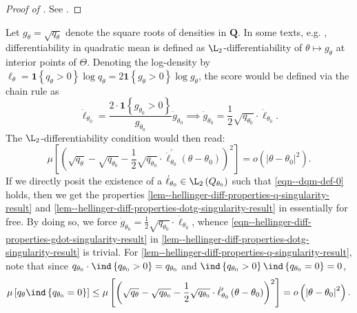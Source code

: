 \begin{proof}[Proof of ]
See .
\end{proof}

Let \(g_{\theta} = \sqrt{q_{\theta}}\) denote the square roots of densities in
\(\mathbf{Q}\).
In some texts, e.g. \citet{1998bickelEfficientAdaptiveEstimation},
differentiability in quadratic mean is defined as \(\L_{2}\)-differentiability
of \(\theta \mapsto g_{\theta}\) at interior points of \(\Theta\).
Denoting the log-density by \(\ell_{\theta} = \mathbf{1} \left\{
q_{\theta} > 0 \right\} \log q_{\theta} = 2 \mathbf{1} \left\{ g_{\theta} > 0
\right\} \log g_{\theta}\), the score would be defined via the chain rule as
\begin{equation}
  \dot{\ell}_{\theta_{0}} = \frac{2 \cdot \mathbf{1} \left\{ g_{\theta_{0}} > 0
  \right\}}{g_{\theta_{0}}} \dot{g}_{\theta_{0}} \implies \dot{g}_{\theta_{0}}
  = \frac{1}{2} \sqrt{q_{\theta_{0}}} \cdot \dot{\ell}_{\theta_{0}}.
  \label{eqn--score-root-density-deriv}
\end{equation}
The \(\L_{2}\)-differentiability condition would then read:
\begin{equation}
  \mu \left[ \left( \sqrt{q_{\theta}} - \sqrt{q_{\theta_{0}}} - \frac{1}{2}
  \sqrt{q_{\theta_{0}}} \cdot \dot{\ell}_{\theta_{0}}^{\prime} \left( \theta -
  \theta_{0} \right) \right)^{2} \right] = o \left( \left| \theta -
  \theta_{0} \right|^{2} \right).
  \label{eqn--dqm-def-0}
\end{equation}
If we directly posit the existence of a \(\dot{\ell}_{\theta_{0}} \in \L_{2}
\left( Q_{\theta_{0}} \right)\) such that \eqref{eqn--dqm-def-0} holds,
then we get the properties
\ref{lem--hellinger-diff-properties-q-singularity-result} and
\ref{lem--hellinger-diff-properties-dotg-singularity-result} in
 essentially for free.
By doing so, we force
\(\dot{g}_{\theta_{0}} = \frac{1}{2} \sqrt{q_{\theta_{0}}} \cdot
\dot{\ell}_{\theta_{0}}\), whence
\eqref{eqn--hellinger-diff-properties-gdot-singularity-result} in
\ref{lem--hellinger-diff-properties-dotg-singularity-result} is trivial.
For 
\ref{lem--hellinger-diff-properties-q-singularity-result}, note that since
\(q_{\theta_{0}} \cdot \ind \left\{ q_{\theta_{0}} > 0 \right\} =
q_{\theta_{0}}\) and \(\ind \left\{ q_{\theta_{0}}
> 0 \right\} \ind \left\{ q_{\theta_{0}} = 0 \right\} = 0\),
\begin{equation*}
  \mu \left[ q_{\theta} \ind \left\{ q_{\theta_{0}} = 0 \right\} \right] \leq
  \mu \left[ \left( \sqrt{q_{\theta}} - \sqrt{q_{\theta_{0}}} - \frac{1}{2}
  \sqrt{q_{\theta_{0}}} \cdot \dot{\ell}_{\theta_{0}}^{\prime} \left( \theta -
  \theta_{0} \right) \right)^{2} \right] = o \left( \left| \theta -
  \theta_{0} \right|^{2} \right).
\end{equation*}

